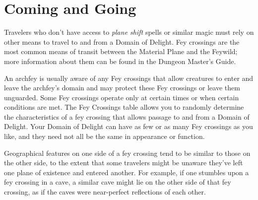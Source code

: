\documentclass[10pt,a4paper,twoside,bg=print,twocolumn,openany,nodeprecatedcode]{dndbook}
\begin{document}
\section{Coming and Going}
Travelers who don't have access to \textit{plane shift} spells or similar magic must rely on other means to travel to and from a Domain of Delight. Fey crossings are the most common means of transit between the Material Plane and the Feywild; more information about them can be found in the Dungeon Master's Guide.

An archfey is usually aware of any Fey crossings that allow creatures to enter and leave the archfey's domain and may protect these Fey crossings or leave them unguarded. Some Fey crossings operate only at certain times or when certain conditions are met. The Fey Crossings table allows you to randomly determine the characteristics of a fey crossing that allows passage to and from a Domain of Delight. Your Domain of Delight can have as few or as many Fey crossings as you like, and they need not all be the same in appearance or function.

Geographical features on one side of a fey crossing tend to be similar to those on the other side, to the extent that some travelers might be unaware they've left one plane of existence and entered another. For example, if one stumbles upon a fey crossing in a cave, a similar cave might lie on the other side of that fey crossing, as if the caves were near-perfect reflections of each other.
\end{document}
